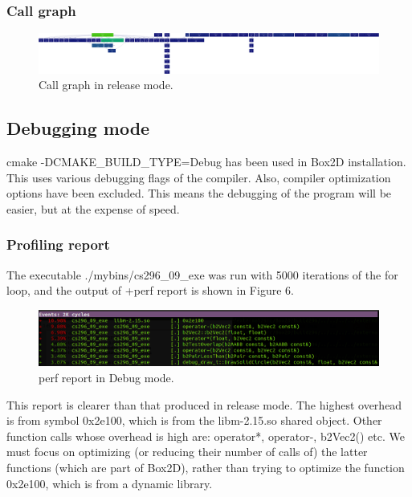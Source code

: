 \documentclass[pdftex,12pt,a4paper]{article}
\begin{document}
\subsubsection{Call graph}

\begin{figure}[h!]
\centering
\includegraphics[scale=.06]{../images/releasecallgraph.png}
\caption{Call graph in release mode.}
\end{figure}

\subsection{Debugging mode}

\par{cmake -DCMAKE\_BUILD\_TYPE=Debug has been used in Box2D installation. This uses various debugging flags of the compiler. Also, compiler optimization options have been excluded. This means the debugging of the program will be easier, but at the expense of speed.}

\subsubsection{Profiling report}

\par{The executable ./mybins/cs296\_09\_exe was run with 5000 iterations of the for loop, and the output of +perf report is shown in Figure 6.}

\begin{figure}[h]
\centering
\includegraphics[scale=.43]{../images/debug.png}
\caption{perf report in Debug mode.}
\end{figure}

\par{This report is clearer than that produced in release mode. The highest overhead is from symbol 0x2e100, which is from the libm-2.15.so shared object. Other function calls whose overhead is high are: operator*, operator-, b2Vec2() etc. We must focus on optimizing (or reducing their number of calls of) the latter functions (which are part of Box2D), rather than trying to optimize the function 0x2e100, which is from a dynamic library.}
\end{document}
